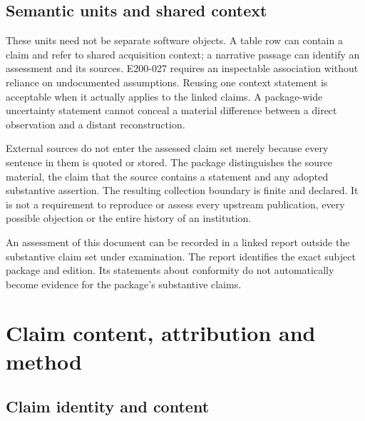 \documentclass[11pt,a4paper]{article}
\begin{document}
\subsection{Semantic units and shared context}

These units need not be separate software objects. A table row can contain a claim and refer to shared acquisition context; a narrative passage can identify an assessment and its sources. E200-027 requires an inspectable association without reliance on undocumented assumptions. Reusing one context statement is acceptable when it actually applies to the linked claims. A package-wide uncertainty statement cannot conceal a material difference between a direct observation and a distant reconstruction.

External sources do not enter the assessed claim set merely because every sentence in them is quoted or stored. The package distinguishes the source material, the claim that the source contains a statement and any adopted substantive assertion. The resulting collection boundary is finite and declared. It is not a requirement to reproduce or assess every upstream publication, every possible objection or the entire history of an institution.

An assessment of this document can be recorded in a linked report outside the substantive claim set under examination. The report identifies the exact subject package and edition. Its statements about conformity do not automatically become evidence for the package's substantive claims.
\section{Claim content, attribution and method}

\subsection{Claim identity and content}
\end{document}
